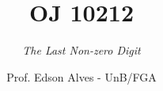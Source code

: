 \title{OJ 10212}
\subtitle{\it The Last Non-zero Digit}
\author{Prof. Edson Alves - UnB/FGA}
\date{}
